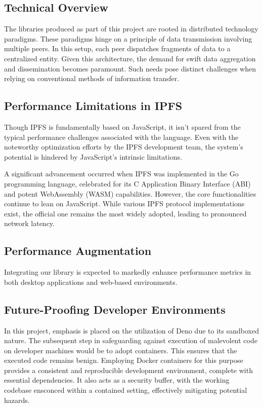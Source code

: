 \documentclass[10pt,journal,compsoc]{IEEEtran}
\begin{document}
\subsection{Technical Overview}

The libraries produced as part of this project are rooted in distributed technology paradigms. These paradigms hinge on a principle of data transmission involving multiple peers. In this setup, each peer dispatches fragments of data to a centralized entity. Given this architecture, the demand for swift data aggregation and dissemination becomes paramount. Such needs pose distinct challenges when relying on conventional methods of information transfer.

\subsection{Performance Limitations in IPFS}

Though IPFS is fundamentally based on JavaScript, it isn't spared from the typical performance challenges associated with the language. Even with the noteworthy optimization efforts by the IPFS development team, the system's potential is hindered by JavaScript's intrinsic limitations.

A significant advancement occurred when IPFS was implemented in the Go programming language, celebrated for its C Application Binary Interface (ABI) and potent WebAssembly (WASM) capabilities. However, the core functionalities continue to lean on JavaScript. While various IPFS protocol implementations exist, the official one remains the most widely adopted, leading to pronounced network latency.

\subsection{Performance Augmentation}

Integrating our library is expected to markedly enhance performance metrics in both desktop applications and web-based environments.

\subsection{Future-Proofing Developer Environments}

In this project, emphasis is placed on the utilization of Deno due to its sandboxed nature. The subsequent step in safeguarding against execution of malevolent code on developer machines would be to adopt containers. This ensures that the executed code remains benign. Employing Docker containers for this purpose provides a consistent and reproducible development environment, complete with essential dependencies. It also acts as a security buffer, with the working codebase ensconced within a contained setting, effectively mitigating potential hazards.
\end{document}
